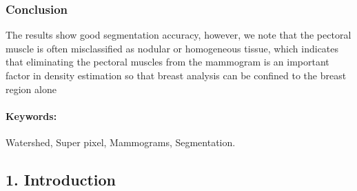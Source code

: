 \documentclass{article}
\begin{document}
\subsubsection*{Conclusion}
The results show good segmentation accuracy, however, we note that the pectoral muscle is often misclassified as nodular or homogeneous tissue, which indicates that eliminating the pectoral muscles from the mammogram is an important factor in density estimation so that breast analysis can be confined to the breast region alone

\paragraph*{Keywords:}Watershed, Super pixel, Mammograms, Segmentation.

\subsection*{1. Introduction}
\end{document}
